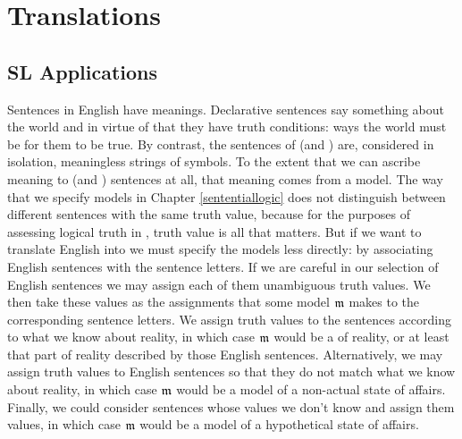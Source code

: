 \chapter{Translations}\label{Translations}

\section{SL Applications}\label{SLApplications}


Sentences in English have meanings.  Declarative sentences say something about the world and in virtue of that they have truth conditions: ways the world must be for them to be true.  By contrast, the sentences of \GSL{} (and \GQL{}) are, considered in isolation, meaningless strings of symbols. To the extent that we can ascribe meaning to \GSL{} (and \GQL{}) sentences at all, that meaning comes from a model.  The way that we specify models in Chapter \ref{sententiallogic} does not distinguish between different sentences with the same truth value, because for the purposes of assessing logical truth in \GSL{}, truth value is all that matters.  But if we want to translate English into \GSL{} we must specify the models less directly: by associating English sentences with the sentence letters.  If we are careful in our selection of English sentences we may assign each of them unambiguous truth values.  We then take these values as the assignments that some model $\mathfrak{m}$ makes to the corresponding sentence letters.  We assign truth values to the sentences according to what we know about reality, in which case $\mathfrak{m}$ would be a  of reality, or at least that part of reality described by those English sentences.  Alternatively, we may assign truth values to English sentences so that they do not match what we know about reality, in which case $\mathfrak{m}$ would be a model of a non-actual state of affairs.  Finally, we could consider sentences whose values we don't know and assign them values, in which case $\mathfrak{m}$ would be a model of a hypothetical state of affairs.

